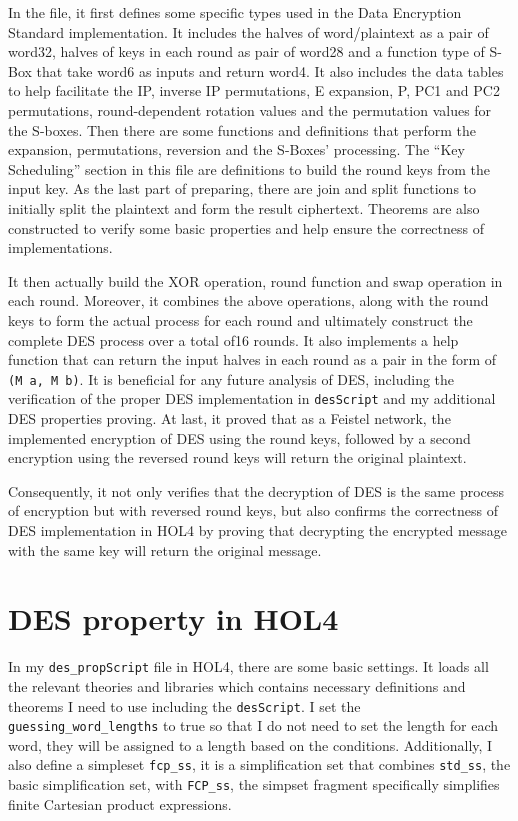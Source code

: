 \documentclass{article}
\begin{document}
In the file, it first defines some specific types used in
the Data Encryption Standard implementation. It includes the halves of word/plaintext as a pair of word32, halves of
keys in each round as pair of word28 and a function type of S-Box that take word6 as inputs and return
word4. It also includes the data tables to help facilitate the IP, inverse IP permutations, E expansion, P, PC1 and PC2
permutations, round-dependent rotation values and the permutation values for the S-boxes. Then there are
some functions and definitions that perform the expansion, permutations, reversion and the S-Boxes' processing. The ``Key Scheduling'' section
in this file are definitions to build the round keys from the input key. As the last part of preparing, there are
join and split functions to initially split the plaintext and form the result ciphertext. Theorems are also constructed to
verify some basic properties and help ensure the correctness of implementations.

It then actually build the XOR operation, round function and swap operation in each round. Moreover, it combines the above operations, along with the
round keys to form the actual process for each round and ultimately construct the complete DES process over a total of16 rounds.
It also implements a help function that can return the input halves in each round as a pair in the form of \verb|(M a, M b)|. It is beneficial
for any future analysis of DES, including the verification of the proper DES implementation in \verb|desScript| and my additional DES
properties proving. At last, it proved that as a Feistel network, the implemented encryption of DES using the round
keys, followed by a second encryption using the reversed round keys
will return the original plaintext.


Consequently, it not only verifies that the decryption of DES is the same process of encryption but with reversed round keys,
but also confirms the correctness of DES implementation in HOL4 by proving that decrypting the encrypted message with the same key
will return the original message.

\section{DES property in HOL4}
In my \verb|des_propScript| file in HOL4, there are some basic settings. It loads all the relevant theories and libraries which contains
necessary definitions and theorems I need to use including the \verb|desScript|. I set the \verb|guessing_word_lengths| to true so that
I do not need to set the length for each word, they will be assigned to a length based on the conditions. Additionally, I also define a simpleset
\verb|fcp_ss|, it is a simplification set that combines \verb|std_ss|, the basic simplification set, with \verb|FCP_ss|, the simpset fragment
specifically simplifies finite Cartesian product expressions.
\end{document}
